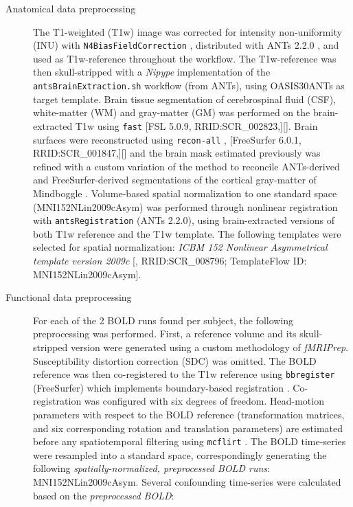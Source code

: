 \documentclass[10pt,letterpaper]{article}
\begin{document}
\begin{description}
\item[Anatomical data preprocessing]
The T1-weighted (T1w) image was corrected for intensity non-uniformity
(INU) with \texttt{N4BiasFieldCorrection} \cite{n4}, distributed with
ANTs 2.2.0 \cite[RRID:SCR\_004757]{ants}, and used as T1w-reference
throughout the workflow.
The T1w-reference was then skull-stripped with a \emph{Nipype} implementation
of the \texttt{antsBrainExtraction.sh} workflow (from ANTs), using OASIS30ANTs
as target template.
Brain tissue segmentation of cerebrospinal fluid (CSF), white-matter (WM) and
gray-matter (GM) was performed on the brain-extracted T1w using
\texttt{fast} \cite{fsl_fast} [FSL 5.0.9, RRID:SCR\_002823,][].
Brain surfaces were reconstructed using \texttt{recon-all} \cite{fs_reconall},
[FreeSurfer 6.0.1, RRID:SCR\_001847,][] and the brain mask estimated
previously was refined with a custom variation of the method to
reconcile ANTs-derived and FreeSurfer-derived segmentations of the
cortical gray-matter of Mindboggle \cite[RRID:SCR\_002438,]{mindboggle}.
Volume-based spatial normalization to one standard space (MNI152NLin2009cAsym)
was performed through nonlinear registration with \texttt{antsRegistration}
(ANTs 2.2.0), using brain-extracted versions of both T1w reference and the T1w template.
The following templates were selected for spatial normalization: \emph{ICBM 152 Nonlinear
Asymmetrical template version 2009c} {[}\cite{mni152nlin2009casym},
RRID:SCR\_008796; TemplateFlow ID: MNI152NLin2009cAsym{]}.
\item[Functional data preprocessing]
For each of the 2 BOLD runs found per subject,
the following preprocessing was performed.
First, a reference volume and its skull-stripped version were generated
using a custom methodology of \emph{fMRIPrep}.
Susceptibility distortion correction (SDC) was omitted.
The BOLD reference was then co-registered to the T1w reference using \texttt{bbregister}
(FreeSurfer) which implements boundary-based registration \cite{bbr}.
Co-registration was configured with six degrees of freedom.
Head-motion parameters with respect to the BOLD reference (transformation matrices,
and six corresponding rotation and translation parameters) are estimated before any
spatiotemporal filtering using \texttt{mcflirt} \cite[FSL 5.0.9,]{mcflirt}.
The BOLD time-series were resampled into a standard space, correspondingly
generating the following \emph{spatially-normalized, preprocessed BOLD runs}:
MNI152NLin2009cAsym.
Several confounding time-series were calculated based on the \emph{preprocessed BOLD}:

\end{description}
\end{document}
